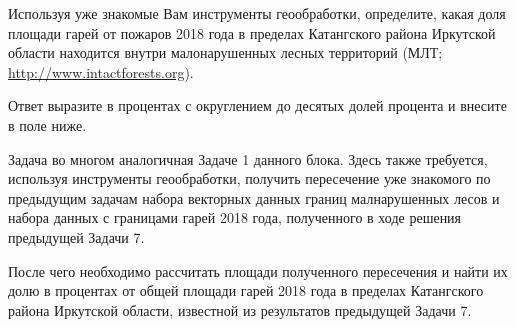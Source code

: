 
Используя уже знакомые Вам инструменты геообработки, определите, какая доля площади гарей от 
пожаров 2018 года в пределах Катангского района Иркутской области находится внутри малонарушенных 
лесных территорий (МЛТ; \url{http://www.intactforests.org}).

Ответ выразите в процентах с округлением до десятых долей процента и внесите в поле ниже. 

\explanationSection

Задача во многом аналогичная Задаче 1 данного блока. Здесь также требуется, используя инструменты геообработки, получить пересечение уже знакомого по предыдущим задачам набора векторных данных границ малнарушенных лесов и набора данных с границами гарей 2018 года, полученного в ходе решения предыдущей Задачи 7.

После чего необходимо рассчитать площади полученного пересечения и найти их долю в процентах от общей площади гарей 2018 года в пределах Катангского района Иркутской области, известной из результатов предыдущей Задачи 7.

